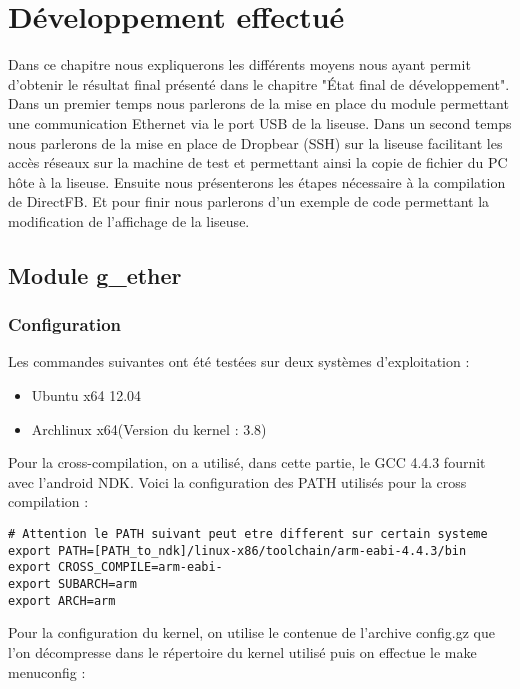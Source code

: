 \chapter{Développement effectué}
Dans ce chapitre nous expliquerons les différents moyens nous ayant permit d'obtenir le résultat final présenté dans le chapitre "État final de développement".\\ 
Dans un premier temps nous parlerons de la mise en place du module permettant une communication Ethernet via le port USB de la liseuse. Dans un second temps nous parlerons de la mise en place de Dropbear (SSH) sur la liseuse facilitant les accès réseaux sur la machine de test et permettant ainsi la copie de fichier du PC hôte à la liseuse. Ensuite nous présenterons les étapes nécessaire à la compilation de DirectFB. Et pour finir nous parlerons d'un exemple de code permettant la modification de l'affichage de la liseuse.

\section{Module g_ether}
\subsection{Configuration}
Les commandes suivantes ont été testées sur deux systèmes d'exploitation : 

\begin{itemize}

\item Ubuntu x64 12.04 
\item Archlinux x64(Version du kernel : 3.8)

\end{itemize}

Pour la cross-compilation, on a utilisé, dans cette partie, le GCC 4.4.3 fournit avec l'android NDK. Voici la configuration des PATH utilisés pour la cross compilation :

\begin{lstlisting}
# Attention le PATH suivant peut etre different sur certain systeme
export PATH=[PATH_to_ndk]/linux-x86/toolchain/arm-eabi-4.4.3/bin 
export CROSS_COMPILE=arm-eabi-
export SUBARCH=arm
export ARCH=arm
\end{lstlisting}

Pour la configuration du kernel, on utilise le contenue de l'archive config.gz que l'on décompresse dans le répertoire du kernel utilisé puis on effectue le make menuconfig :

